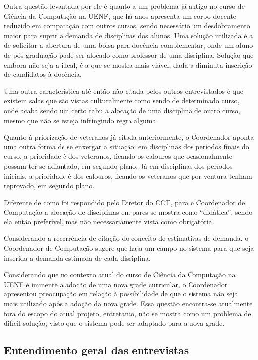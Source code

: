 Outra questão levantada por ele é quanto a um problema já antigo no curso de Ciência da Computação na UENF, que há anos apresenta um corpo docente reduzido em comparação com outros cursos, sendo necessário um desdobramento maior para suprir a demanda de disciplinas dos alunos. Uma solução utilizada é a de solicitar a abertura de uma bolsa para docência complementar, onde um aluno de pós-graduação pode ser alocado como professor de uma disciplina. Solução que embora não seja a ideal, é a que se mostra mais viável, dada a diminuta inscrição de candidatos à docência.

Uma outra característica até então não citada pelos outros entrevistados é que existem salas que são vistas culturalmente como sendo de determinado curso, onde acaba sendo um certo tabu a alocação de uma disciplina de outro curso, mesmo que não se esteja infringindo regra alguma.

Quanto à priorização de veteranos já citada anteriormente, o Coordenador aponta uma outra forma de se enxergar a situação: em disciplinas dos períodos finais do curso, a prioridade é dos veteranos, ficando os calouros que ocasionalmente possam ter se adiantado, em segundo plano. Já em disciplinas dos períodos iniciais, a prioridade é dos calouros, ficando os veteranos que por ventura tenham reprovado, em segundo plano.

Diferente de como foi respondido pelo Diretor do CCT, para o Coordenador de Computação a alocação de disciplinas em pares se mostra como ``didática'', sendo ela então preferível, mas não necessariamente vista como obrigatória.

Considerando a recorrência de citação do conceito de estimativas de demanda, o Coordenador de Computação sugere que haja um campo no sistema para que seja inserida a demanda estimada de cada disciplina.

Considerando que no contexto atual do curso de Ciência da Computação na UENF é iminente a adoção de uma nova grade curricular, o Coordenador apresentou preocupação em relação à possibilidade de que o sistema não seja mais utilizado após a adoção da nova grade. Essa questão encontra-se atualmente fora do escopo do atual projeto, entretanto, não se mostra como um problema de difícil solução, visto que o sistema pode ser adaptado para a nova grade.

\subsection{Entendimento geral das entrevistas} \label{ssec:conclusaoEntrevistas} %

